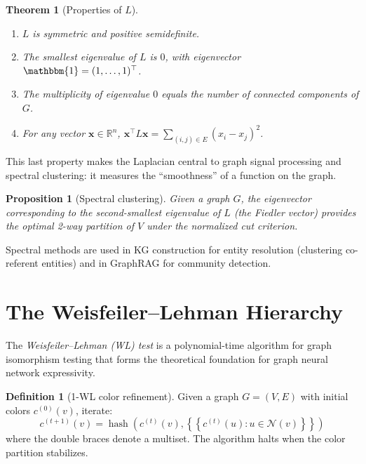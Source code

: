 \documentclass[11pt,a4paper,oneside,openany]{book}
\theoremstyle{definition}
\newtheorem{definition}{Definition}[chapter]
\theoremstyle{plain}
\newtheorem{theorem}{Theorem}[chapter]
\newtheorem{proposition}{Proposition}[chapter]
\theoremstyle{remark}
\newcommand{\R}{\mathbb{R}}
\newcommand{\bone}{\mathbbm{1}}
\begin{document}
\begin{theorem}[Properties of $L$]
	\label{thm:laplacian}
	\begin{enumerate}
		\item $L$ is symmetric and positive semidefinite.
		\item The smallest eigenvalue of $L$ is $0$, with eigenvector $\bone = (1, \dots, 1)^\top$.
		\item The multiplicity of eigenvalue $0$ equals the number of connected components of $G$.
		\item For any vector $\mathbf{x} \in \R^n$, $\mathbf{x}^\top L \mathbf{x} = \sum_{(i,j) \in E} (x_i - x_j)^2$.
	\end{enumerate}
\end{theorem}

\noindent This last property makes the Laplacian central to graph signal processing and spectral clustering: it measures the ``smoothness'' of a function on the graph.

\begin{proposition}[Spectral clustering]
	Given a graph $G$, the eigenvector corresponding to the second-smallest eigenvalue of $L$ (the \emph{Fiedler vector}) provides the optimal 2-way partition of $V$ under the normalized cut criterion.
\end{proposition}

Spectral methods are used in KG construction for entity resolution (clustering co-referent entities) and in GraphRAG for community detection.

\section{The Weisfeiler--Lehman Hierarchy}\label{sec:wl}

The \emph{Weisfeiler--Lehman (WL) test} is a polynomial-time algorithm for graph isomorphism testing that forms the theoretical foundation for graph neural network expressivity.

\begin{definition}[1-WL color refinement]
	Given a graph $G = (V, E)$ with initial colors $c^{(0)}(v)$, iterate:
	$$c^{(t+1)}(v) = \operatorname{hash}\!\left( c^{(t)}(v), \left\{\!\!\left\{ c^{(t)}(u) : u \in \mathcal{N}(v) \right\}\!\!\right\} \right)$$
	where the double braces denote a multiset. The algorithm halts when the color partition stabilizes.
\end{definition}
\end{document}
